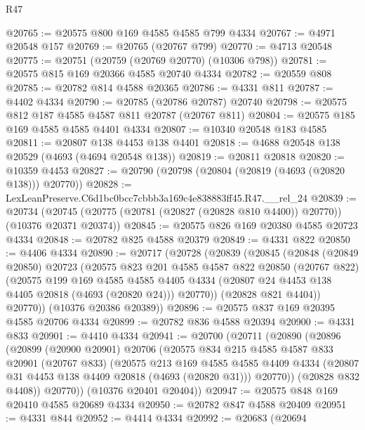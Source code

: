 \begin{lexlean}{R47}
\begin{coremodule}
@20765 := @20575 @800 @169 @4585 @4585 @799 @4334
@20767 := @4971 @20548 @157
@20769 := @20765 (@20767 @799)
@20770 := @4713 @20548
@20775 := @20751 (@20759 (@20769 @20770) (@10306 @798))
@20781 := @20575 @815 @169 @20366 @4585 @20740 @4334
@20782 := @20559 @808
@20785 := @20782 @814 @4588 @20365
@20786 := @4331 @811
@20787 := @4402 @4334
@20790 := @20785 (@20786 @20787) @20740
@20798 := @20575 @812 @187 @4585 @4587 @811 @20787 (@20767 @811)
@20804 := @20575 @185 @169 @4585 @4585 @4401 @4334
@20807 := @10340 @20548 @183 @4585
@20811 := @20807 @138 @4453 @138 @4401
@20818 := @4688 @20548 @138 @20529 (@4693 (@4694 @20548 @138))
@20819 := @20811 @20818
@20820 := @10359 @4453
@20827 := @20790 (@20798 (@20804 (@20819 (@4693 (@20820 @138))) @20770))
@20828 := LexLeanPreserve.C6d1bc0bcc7cbbb3a169c4e838883ff45.R47.__rel_24
@20839 := @20734
    (@20745 (@20775 (@20781 (@20827 (@20828 @810 @4400)) @20770)) (@10376 @20371 @20374))
@20845 := @20575 @826 @169 @20380 @4585 @20723 @4334
@20848 := @20782 @825 @4588 @20379
@20849 := @4331 @822
@20850 := @4406 @4334
@20890 := @20717
    (@20728
      (@20839
        (@20845
          (@20848
            (@20849 @20850)
            @20723
            (@20575
              @823
              @201
              @4585
              @4587
              @822
              @20850
              (@20767 @822)
              (@20575
                @199
                @169
                @4585
                @4585
                @4405
                @4334
                (@20807 @24 @4453 @138 @4405 @20818 (@4693 (@20820 @24)))
                @20770))
            (@20828 @821 @4404))
          @20770))
      (@10376 @20386 @20389))
@20896 := @20575 @837 @169 @20395 @4585 @20706 @4334
@20899 := @20782 @836 @4588 @20394
@20900 := @4331 @833
@20901 := @4410 @4334
@20941 := @20700
    (@20711
      (@20890
        (@20896
          (@20899
            (@20900 @20901)
            @20706
            (@20575
              @834
              @215
              @4585
              @4587
              @833
              @20901
              (@20767 @833)
              (@20575
                @213
                @169
                @4585
                @4585
                @4409
                @4334
                (@20807 @31 @4453 @138 @4409 @20818 (@4693 (@20820 @31)))
                @20770))
            (@20828 @832 @4408))
          @20770))
      (@10376 @20401 @20404))
@20947 := @20575 @848 @169 @20410 @4585 @20689 @4334
@20950 := @20782 @847 @4588 @20409
@20951 := @4331 @844
@20952 := @4414 @4334
@20992 := @20683
    (@20694

\end{coremodule}
\end{lexlean}
